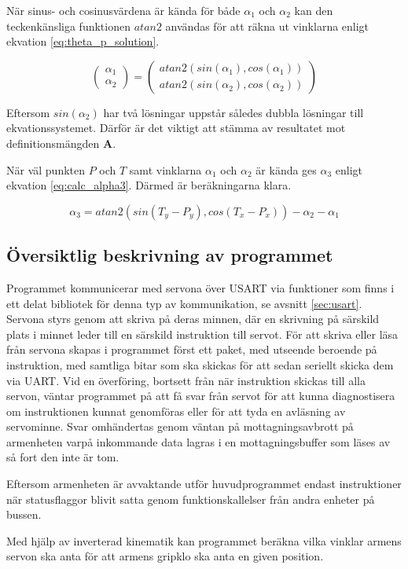 När sinus- och cosinusvärdena är kända för både $\alpha_{1}$ och $\alpha_{2}$ kan den teckenkänsliga funktionen $atan2$ användas för att räkna ut vinklarna enligt ekvation \ref{eq:theta_p_solution}.

\begin{equation}
	\label{eq:theta_p_solution}
	\begin{pmatrix}
		\alpha_{1}\\
		\alpha_{2}
	\end{pmatrix}
	=
	\begin{pmatrix}
		atan2(sin(\alpha_{1}), cos(\alpha_{1}))\\
		atan2(sin(\alpha_{2}), cos(\alpha_{2}))
	\end{pmatrix}
\end{equation}

Eftersom $sin(\alpha_{2})$ har två lösningar uppstår således dubbla lösningar till ekvationssystemet. Därför är det viktigt att stämma av resultatet mot definitionsmängden $\mathbf{A}$.

När väl punkten $P$ och $T$ samt vinklarna $\alpha_{1}$ och $\alpha_{2}$ är kända ges $\alpha_{3}$ enligt ekvation \ref{eq:calc_alpha3}. Därmed är beräkningarna klara.

\begin{equation}
	\label{eq:calc_alpha3}
\alpha_{3} = atan2(sin(T_y - P_y), cos(T_x - P_x)) - \alpha_{2} - \alpha_{1}
\end{equation}

\subsection{Översiktlig beskrivning av programmet}

Programmet kommunicerar med servona över USART via funktioner som finns i ett delat bibliotek för denna typ av kommunikation, se avsnitt \ref{sec:usart}. Servona styrs genom att skriva på deras minnen, där en skrivning på särskild plats i minnet leder till en särskild instruktion till servot. För att skriva eller läsa från servona skapas i programmet först ett paket, med utseende beroende på instruktion, med samtliga bitar som ska skickas för att sedan seriellt skicka dem via UART. Vid en överföring, bortsett från när instruktion skickas till alla servon, väntar programmet på att få svar från servot för att kunna diagnostisera om instruktionen kunnat genomföras eller för att tyda en avläsning av servominne. Svar omhändertas genom väntan på mottagningsavbrott på armenheten varpå inkommande data lagras i en mottagningsbuffer som läses av så fort den inte är tom.

Eftersom armenheten är avvaktande utför huvudprogrammet endast instruktioner när statusflaggor blivit satta genom funktionskallelser från andra enheter på bussen. 

Med hjälp av inverterad kinematik kan programmet beräkna vilka vinklar armens servon ska anta för att armens gripklo ska anta en given position.
